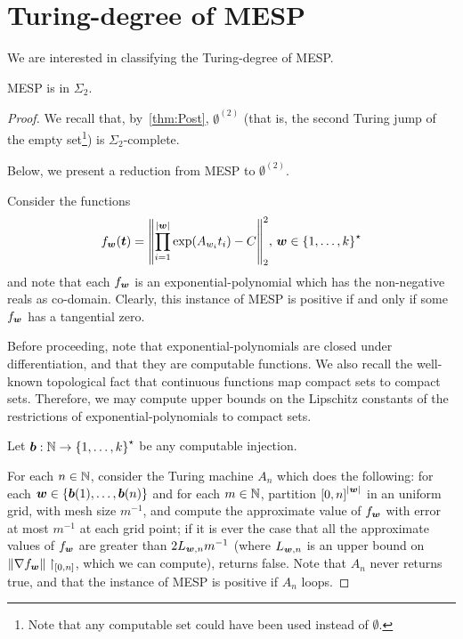 \section{Turing-degree of MESP}
\label{sec:turing-degree-lics}

We are interested in classifying the Turing-degree of MESP\@.

\begin{theorem}
\label{thm:turing-degree-2}
  MESP is in $\Sigma_{2}$.
\end{theorem}

\begin{proof}
We recall that, by~\cref{thm:Post}, $\emptyset^{(2)}$ (that is, the second Turing jump of the empty set\footnote{Note that any computable set could have been used instead of $\emptyset$.}) is $\Sigma_{2}$-complete.

Below, we present a reduction from MESP to $\emptyset^{(2)}$.

Consider the functions
\begin{equation*}
    f_{\boldsymbol{w}}(\boldsymbol{t}) = {\left \| \prod \limits_{i=1}^{\lvert \boldsymbol{w} \rvert} \exp(A_{w_{i}} t_{i}) - C \right \|}_{2}^{2}, \, \boldsymbol{w} \in {\lbrace 1, \ldots, k \rbrace}^{\star}
\end{equation*}
and note that each $f_{\boldsymbol{w}}$ is an exponential-polynomial which has the non-negative reals as co-domain. Clearly, this instance of MESP is positive if and only if some $f_{\boldsymbol{w}}$ has a tangential zero.

Before proceeding, note that exponential-polynomials are closed under differentiation, and that they are computable functions. We also recall the well-known topological fact that continuous functions map compact sets to compact sets. Therefore, we may compute upper bounds on the Lipschitz constants of the restrictions of exponential-polynomials to compact sets.

Let $\boldsymbol{b} : \mathbb{N} \rightarrow {\lbrace 1, \ldots, k \rbrace}^{\star}$ be any computable injection.

For each $n \in \mathbb{N}$, consider the Turing machine $A_{n}$ which does the following:
for each $\boldsymbol{w} \in \lbrace \boldsymbol{b}(1), \ldots, \boldsymbol{b}(n) \rbrace$ and for each $m \in \mathbb{N}$, partition ${[0,n]}^{\lvert \boldsymbol{w} \rvert}$ in an uniform grid, with mesh size $m^{-1}$, and compute the approximate value of $f_{\boldsymbol{w}}$ with error at most $m^{-1}$ at each grid point;
if it is ever the case that all the approximate values of $f_{\boldsymbol{w}}$ are greater than $2 L_{\boldsymbol{w}, n} m^{-1}$ (where $L_{\boldsymbol{w}, n}$ is an upper bound on ${\| \nabla f_{\boldsymbol{w}} \|}\restriction_{[0,n]}$, which we can compute), returns false. Note that $A_{n}$ never returns true, and that the instance of MESP is positive if $A_{n}$ loops.


\end{proof}
